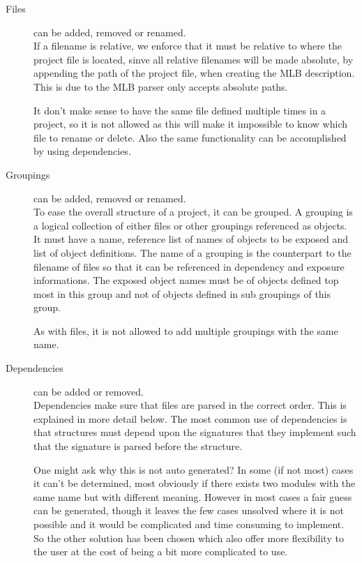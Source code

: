 \begin{description}
\item[Files] can be added, removed or renamed. \\

  If a filename is relative, we enforce that it must be relative to where
  the project file is located, sinve all relative filenames will be made
  absolute, by appending the path of the project file, when creating the MLB
  description. This is due to the MLB parser 
  only accepts absolute paths.

  It don't make sense to have the same file defined multiple times in a project,
  so it is not allowed as this will make it impossible to know which file to
  rename or delete. Also the same functionality can be accomplished by using
  dependencies.

\item[Groupings] can be added, removed or renamed. \\

  To ease the overall structure of a project, it can be grouped. A grouping is a
  logical collection of either files or other groupings referenced as
  objects. It must have a name, reference list of names of objects to be exposed
  and list of object definitions. The name of a grouping is the counterpart to
  the filename of files so that it can be referenced in dependency and exposure
  informations. The exposed object names must be of objects defined top most in
  this group and not of objects defined in sub groupings of this group.

  As with files, it is not allowed to add multiple groupings with the same name.


\item[Dependencies] can be added or removed. \\

  Dependencies make sure that files are parsed in the correct order. This is
  explained in more detail below. The most common use of dependencies is that
  structures must depend upon the signatures that they implement such that the
  signature is parsed before the structure.


  One might ask why this is not auto generated? In some (if not most) cases it
  can't be determined, most obviously if there exists two modules with the same
  name but with different meaning. However in most cases a fair guess can be
  generated, though it leaves the few cases unsolved where it is not possible
  and it would be complicated and time consuming to implement. So the other
  solution has been chosen which also offer more flexibility to the user at the
  cost of being a bit more complicated to use.



\end{description}
